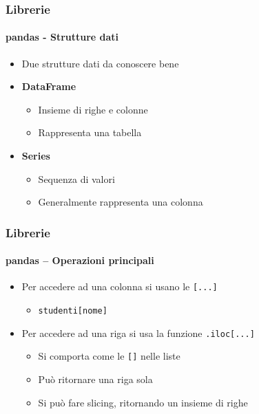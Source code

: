 \begin{contentframe}
    \frametitle{Librerie}
    \framesubtitle{pandas - Strutture dati}

    \begin{itemize}
        \item Due strutture dati da conoscere bene

        \bigskip
        \item \textbf{DataFrame}
        \begin{itemize}
            \item Insieme di righe e colonne
            \item Rappresenta una tabella
        \end{itemize}

        \bigskip
        \item \textbf{Series}
        \begin{itemize}
            \item Sequenza di valori
            \item Generalmente rappresenta una colonna
        \end{itemize}
    \end{itemize}
\end{contentframe}

\begin{contentframe}
    \frametitle{Librerie}
    \framesubtitle{pandas -- Operazioni principali}

    \begin{itemize}
        \item Per accedere ad una colonna si usano le \texttt{[...]}
        \begin{itemize}
            \item \texttt{studenti[\textquotesingle{}nome\textquotesingle{}]}
        \end{itemize}

        \bigskip
        \item Per accedere ad una riga si usa la funzione \texttt{.iloc[...]}
        \begin{itemize}
            \item Si comporta come le \texttt{[]} nelle liste
            \item Può ritornare una riga sola
            \item Si può fare slicing, ritornando un insieme di righe
        \end{itemize}
    \end{itemize}
\end{contentframe}

